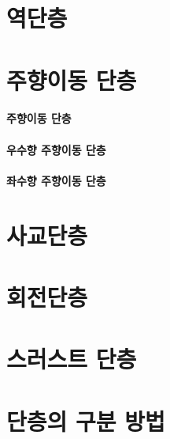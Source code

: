 \documentclass[12pt, a4paper, oneside]{book}
\begin{document}
	
	\clearpage
	\section{역단층}
	
	\clearpage
	\section{주향이동 단층}
	
		\paragraph{주향이동 단층}
		

		\paragraph{우수향 주향이동 단층}


		\paragraph{좌수향 주향이동 단층}






	\clearpage
	\section{사교단층}
	


	\clearpage
	\section{회전단층}
	


	\clearpage
	\section{스러스트 단층}


	\clearpage
	\section{단층의 구분 방법}
	
\end{document}
